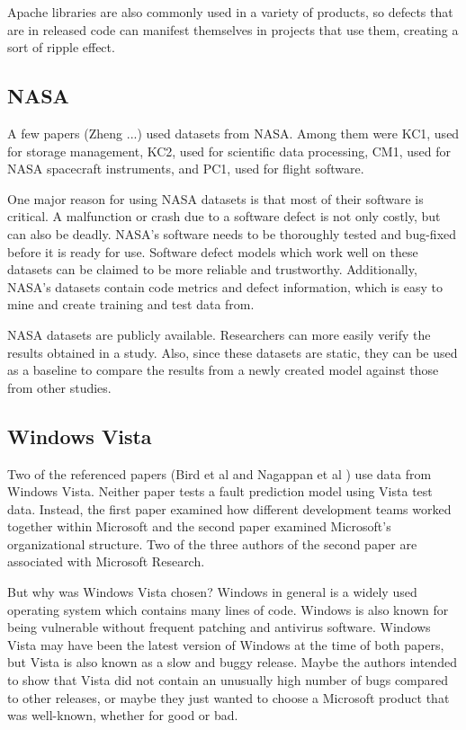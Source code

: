 \documentclass{sig-alternate-05-2015}
\begin{document}
Apache libraries are also commonly used in a variety of products, so defects that are in released code can manifest themselves in projects that use them, creating a sort of ripple effect.

\subsection{NASA}
A few papers (Zheng \cite{zheng2010}...) used datasets from NASA. Among them were KC1, used for storage management, KC2, used for scientific data processing, CM1, used for NASA spacecraft instruments, and PC1, used for flight software.

One major reason for using NASA datasets is that most of their software is critical. A malfunction or crash due to a software defect is not only costly, but can also be deadly. NASA's software needs to be thoroughly tested and bug-fixed before it is ready for use. Software defect models which work well on these datasets can be claimed to be more reliable and trustworthy. Additionally, NASA's datasets contain code metrics and defect information, which is easy to mine and create training and test data from.

NASA datasets are publicly available. Researchers can more easily verify the results obtained in a study. Also, since these datasets are static, they can be used as a baseline to compare the results from a newly created model against those from other studies.
\subsection{Windows Vista}
Two of the referenced papers (Bird et al \cite{Bird} and Nagappan et al \cite{Nagappan}) use data from Windows Vista. Neither paper tests a fault prediction model using Vista test data. Instead, the first paper examined how different development teams worked together within Microsoft and the second paper examined Microsoft's organizational structure. Two of the three authors of the second paper are associated with Microsoft Research. 

But why was Windows Vista chosen? Windows in general is a widely used operating system which contains many lines of code. Windows is also known for being vulnerable without frequent patching and antivirus software. Windows Vista may have been the latest version of Windows at the time of both papers, but Vista is also known as a slow and buggy release. Maybe the authors intended to show that Vista did not contain an unusually high number of bugs compared to other releases, or maybe they just wanted to choose a Microsoft product that was well-known, whether for good or bad.
\end{document}
